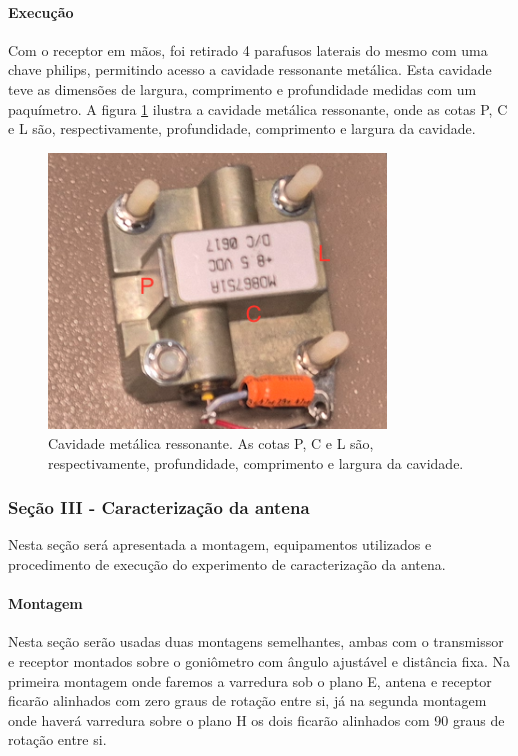 \documentclass[12pt]{article}
\begin{document}
\paragraph{Execução}
Com o receptor em mãos, foi retirado 4 parafusos laterais do mesmo
com uma chave philips, permitindo acesso a cavidade ressonante
metálica. Esta cavidade teve as dimensões de largura, comprimento e
profundidade medidas com um paquímetro. A figura
\ref{fig:img/metodo2cavidade.png} ilustra a cavidade metálica
ressonante, onde as cotas P, C e L são, respectivamente,
profundidade, comprimento e largura da cavidade.

\begin{figure}[H]
  \centering
  \includegraphics[width=0.8\textwidth]{img/metodo2cavidade.png}
  \caption{Cavidade metálica ressonante. As cotas P, C e L são,
  respectivamente, profundidade, comprimento e largura da cavidade.}
  \label{fig:img/metodo2cavidade.png}
\end{figure}

\subsubsection{Seção III - Caracterização da antena}
Nesta seção será apresentada a montagem, equipamentos utilizados e
procedimento de execução do experimento de caracterização da antena.

\paragraph{Montagem}
Nesta seção serão usadas duas montagens semelhantes, ambas com o
transmissor e receptor montados sobre o goniômetro com ângulo
ajustável e distância fixa. Na primeira montagem onde faremos a
varredura sob o plano E, antena e receptor ficarão alinhados com zero
graus de rotação entre si, já na segunda montagem onde haverá
varredura sobre o plano H os dois ficarão alinhados com 90 graus de
rotação entre si.
\end{document}

